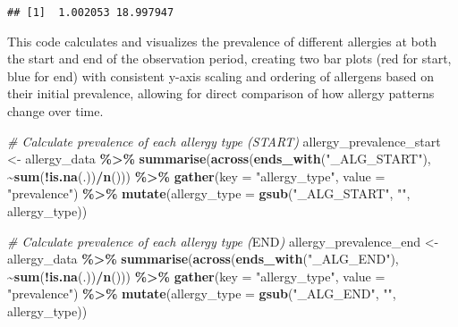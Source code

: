 \documentclass[
]{article}
\newenvironment{Shaded}{\begin{snugshade}}{\end{snugshade}}
\newcommand{\AttributeTok}[1]{\textcolor[rgb]{0.13,0.29,0.53}{#1}}
\newcommand{\CommentTok}[1]{\textcolor[rgb]{0.56,0.35,0.01}{\textit{#1}}}
\newcommand{\FunctionTok}[1]{\textcolor[rgb]{0.13,0.29,0.53}{\textbf{#1}}}
\newcommand{\NormalTok}[1]{#1}
\newcommand{\OtherTok}[1]{\textcolor[rgb]{0.56,0.35,0.01}{#1}}
\newcommand{\RegionMarkerTok}[1]{#1}
\newcommand{\SpecialCharTok}[1]{\textcolor[rgb]{0.81,0.36,0.00}{\textbf{#1}}}
\newcommand{\StringTok}[1]{\textcolor[rgb]{0.31,0.60,0.02}{#1}}
\begin{document}
\begin{verbatim}
## [1]  1.002053 18.997947
\end{verbatim}

This code calculates and visualizes the prevalence of different
allergies at both the start and end of the observation period, creating
two bar plots (red for start, blue for end) with consistent y-axis
scaling and ordering of allergens based on their initial prevalence,
allowing for direct comparison of how allergy patterns change over time.

\begin{Shaded}
\begin{Highlighting}[]
\CommentTok{\# Calculate prevalence of each allergy type (START)}
\NormalTok{allergy\_prevalence\_start }\OtherTok{\textless{}{-}}\NormalTok{ allergy\_data }\SpecialCharTok{\%\textgreater{}\%}
  \FunctionTok{summarise}\NormalTok{(}\FunctionTok{across}\NormalTok{(}\FunctionTok{ends\_with}\NormalTok{(}\StringTok{"\_ALG\_START"}\NormalTok{), }
                  \SpecialCharTok{\textasciitilde{}}\FunctionTok{sum}\NormalTok{(}\SpecialCharTok{!}\FunctionTok{is.na}\NormalTok{(.))}\SpecialCharTok{/}\FunctionTok{n}\NormalTok{())) }\SpecialCharTok{\%\textgreater{}\%}
  \FunctionTok{gather}\NormalTok{(}\AttributeTok{key =} \StringTok{"allergy\_type"}\NormalTok{, }\AttributeTok{value =} \StringTok{"prevalence"}\NormalTok{) }\SpecialCharTok{\%\textgreater{}\%}
  \FunctionTok{mutate}\NormalTok{(}\AttributeTok{allergy\_type =} \FunctionTok{gsub}\NormalTok{(}\StringTok{"\_ALG\_START"}\NormalTok{, }\StringTok{""}\NormalTok{, allergy\_type))}

\CommentTok{\# Calculate prevalence of each allergy type (}\RegionMarkerTok{END}\CommentTok{)}
\NormalTok{allergy\_prevalence\_end }\OtherTok{\textless{}{-}}\NormalTok{ allergy\_data }\SpecialCharTok{\%\textgreater{}\%}
  \FunctionTok{summarise}\NormalTok{(}\FunctionTok{across}\NormalTok{(}\FunctionTok{ends\_with}\NormalTok{(}\StringTok{"\_ALG\_END"}\NormalTok{), }
                  \SpecialCharTok{\textasciitilde{}}\FunctionTok{sum}\NormalTok{(}\SpecialCharTok{!}\FunctionTok{is.na}\NormalTok{(.))}\SpecialCharTok{/}\FunctionTok{n}\NormalTok{())) }\SpecialCharTok{\%\textgreater{}\%}
  \FunctionTok{gather}\NormalTok{(}\AttributeTok{key =} \StringTok{"allergy\_type"}\NormalTok{, }\AttributeTok{value =} \StringTok{"prevalence"}\NormalTok{) }\SpecialCharTok{\%\textgreater{}\%}
  \FunctionTok{mutate}\NormalTok{(}\AttributeTok{allergy\_type =} \FunctionTok{gsub}\NormalTok{(}\StringTok{"\_ALG\_END"}\NormalTok{, }\StringTok{""}\NormalTok{, allergy\_type))}


\end{Highlighting}
\end{Shaded}
\end{document}
